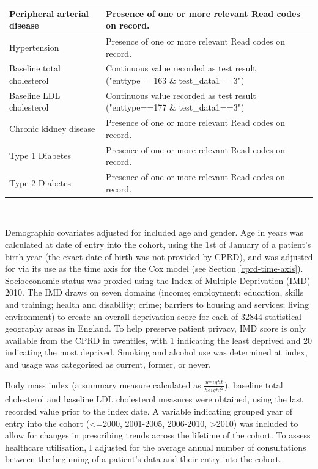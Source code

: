 \documentclass[a4paper, twoside]{templates/ociamthesis}
\begin{document}
\begin{table}[H]
\begin{tabular}[t]{>{\raggedright\arraybackslash}p{15em}>{\centering\arraybackslash}p{25em}}
\midrule
Peripheral arterial disease & Presence of one or more relevant Read codes on record.\\
\midrule
\addlinespace
Hypertension & Presence of one or more relevant Read codes on record.\\
\midrule
Baseline total cholesterol & Continuous value recorded as test result ("enttype==163 \& test\_data1==3")\\
\midrule
Baseline LDL cholesterol & Continuous value recorded as test result ("enttype==177 \& test\_data1==3")\\
\midrule
Chronic kidney disease & Presence of one or more relevant Read codes on record.\\
\midrule
Type 1 Diabetes & Presence of one or more relevant Read codes on record.\\
\midrule
\addlinespace
Type 2 Diabetes & Presence of one or more relevant Read codes on record.\\
\bottomrule
\end{tabular}
\end{table}

~

Demographic covariates adjusted for included age and gender. Age in years was calculated at date of entry into the cohort, using the 1st of January of a patient's birth year (the exact date of birth was not provided by CPRD), and was adjusted for via its use as the time axis for the Cox model (see Section \ref{cprd-time-axis}). Socioeconomic status was proxied using the Index of Multiple Deprivation (IMD) 2010. The IMD draws on seven domains (income; employment; education, skills and training; health and disability; crime; barriers to housing and services; living environment) to create an overall deprivation score for each of 32844 statistical geography areas in England. To help preserve patient privacy, IMD score is only available from the CPRD in twentiles, with 1 indicating the least deprived and 20 indicating the most deprived. Smoking and alcohol use was determined at index, and usage was categorised as current, former, or never.

Body mass index (a summary measure calculated as \(\frac{weight}{height^2}\)), baseline total cholesterol and baseline LDL cholesterol measures were obtained, using the last recorded value prior to the index date. A variable indicating grouped year of entry into the cohort (\textless=2000, 2001-2005, 2006-2010, \textgreater2010) was included to allow for changes in prescribing trends across the lifetime of the cohort. To assess healthcare utilisation, I adjusted for the average annual number of consultations between the beginning of a patient's data and their entry into the cohort.
\end{document}
